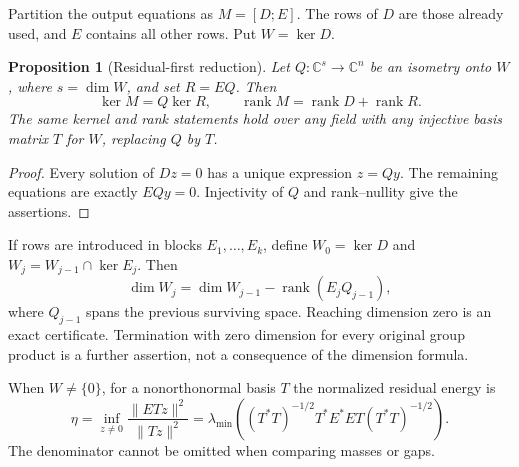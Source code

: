 \documentclass[11pt,a4paper,oneside]{report}
\newtheorem{proposition}[theorem]{Proposition}
\theoremstyle{definition}
\theoremstyle{remark}
\DeclareMathOperator{\rank}{rank}
\newcommand{\C}{\mathbb C}
\begin{document}
Partition the output equations as $M=[D;E]$. The rows of $D$ are
those already used, and $E$ contains all other rows. Put $W=\ker D$.

\begin{proposition}[Residual-first reduction]\label{M06:prop:rows}
Let $Q:\C^s\to\C^n$ be an isometry onto $W$, where $s=\dim W$,
and set $R=EQ$. Then
\[
\ker M=Q\ker R,\qquad
\rank M=\rank D+\rank R.
\]
The same kernel and rank statements hold over any field with any
injective basis matrix $T$ for $W$, replacing $Q$ by $T$.
\end{proposition}
\begin{proof}
Every solution of $Dz=0$ has a unique expression $z=Qy$.
The remaining equations are exactly $EQy=0$. Injectivity of $Q$
and rank--nullity give the assertions.
\end{proof}

If rows are introduced in blocks $E_1,\ldots,E_k$, define
$W_0=\ker D$ and $W_j=W_{j-1}\cap\ker E_j$. Then
\[
\dim W_j=\dim W_{j-1}-\rank(E_jQ_{j-1}),
\]
where $Q_{j-1}$ spans the previous surviving space. Reaching
dimension zero is an exact certificate. Termination with zero
dimension for every original group product is a further assertion,
not a consequence of the dimension formula.

When $W\ne\{0\}$, for a nonorthonormal basis $T$ the normalized residual energy is
\begin{equation}\label{M06:eq:eta}
\eta=\inf_{z\ne0}\frac{\|ETz\|^2}{\|Tz\|^2}
=\lambda_{\min}\!\left((T^*T)^{-1/2}T^*E^*ET(T^*T)^{-1/2}\right).
\end{equation}
The denominator cannot be omitted when comparing masses or gaps.
\end{document}
